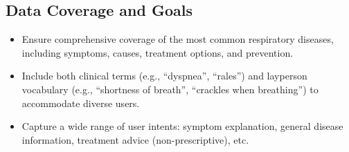 \subsection*{Data Coverage and Goals}
\begin{itemize}
    \item Ensure comprehensive coverage of the most common respiratory diseases, including symptoms, causes, treatment options, and prevention.
    
    \item Include both clinical terms (e.g., ``dyspnea'', ``rales'') and layperson vocabulary (e.g., ``shortness of breath'', ``crackles when breathing'') to accommodate diverse users.
    
    \item Capture a wide range of user intents: symptom explanation, general disease information, treatment advice (non-prescriptive), etc.
\end{itemize}